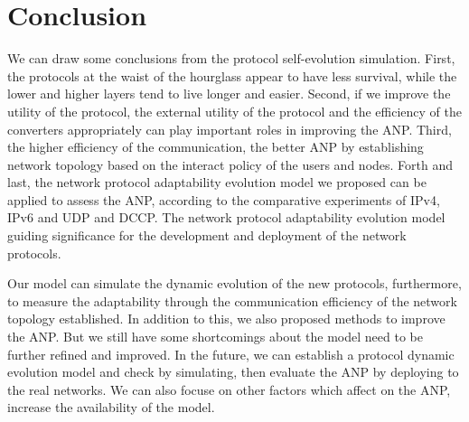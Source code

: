 \documentclass{article}
\begin{document}
\section{Conclusion}
We can draw some conclusions from the protocol self-evolution simulation. First,  the protocols at the waist of
the hourglass appear to have less survival, while the lower and higher layers tend to live longer and easier.
Second, if we improve the utility of the protocol, the external utility of the protocol and the efficiency of
the converters appropriately can play important roles in improving the ANP. Third, the higher efficiency of the
communication, the better ANP by establishing network topology based on the interact policy of the users and
nodes. Forth and last, the network protocol adaptability evolution model we proposed can be applied to assess
the ANP, according to the comparative experiments of IPv4, IPv6 and UDP and DCCP. The network protocol adaptability
evolution model guiding significance for the development and deployment of the network protocols.

Our model can simulate the dynamic evolution of the new protocols, furthermore, to measure the adaptability
through the communication efficiency of the network topology established. In addition to this, we also proposed
methods to improve the ANP. But we still have some shortcomings about the model need to be further refined and
improved. In the future, we can establish a protocol dynamic evolution model and check by simulating,  then
evaluate the ANP by deploying to the real networks. We can also focuse on other factors which affect on the
ANP, increase the availability of the model.
\end{document}
